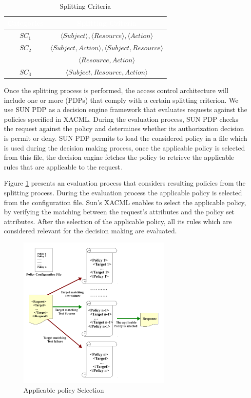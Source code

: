 \begin{table}[h!]
\centering
\setlength{\extrarowheight}{6 pt}
\begin{tabular}{|>{\small}c|>{\small}c|} 
\hline  \rowcolor{black} 
\bf
\textcolor{white}{Categories}& \bf \textcolor{white}{Splitting Criteria}\\ \hline
$SC_{1}$& {$\langle Subject \rangle, \langle Resource\rangle, \langle Action\rangle$}\\ \hline
$SC_{2}$& {$\langle Subject,Action \rangle, \langle Subject,Resource\rangle$}\\&{$\langle Resource,Action\rangle$}\\  \hline
$SC_{3}$& {$\langle Subject,Resource,Action\rangle$}\\ \hline
\end{tabular}
\caption{Splitting Criteria}
\label{table1}\end{table}



Once the splitting process is performed, the access control architecture will include one or more (PDPs) that comply with a certain splitting criterion.
We use SUN PDP \cite{sunxacml} as a decision engine framework that evaluates requests against the policies specified in XACML.
During the evaluation process, SUN PDP checks the request against the policy and determines whether its authorization
decision is 
permit or deny. SUN PDP permits to load the considered policy in a file which is used during the decision making process, once the applicable policy 
is selected from this file, the decision engine fetches the policy to retrieve the applicable rules that are applicable to the request.


Figure \ref{requestevaluation} presents an evaluation process that considers resulting policies from the splitting process. 
During the evaluation process the applicable 
policy is selected from the configuration file. Sun's XACML enables to select the applicable policy, by verifying the matching between the request's attributes
 and the policy set attributes. 
After the selection of the applicable policy, all its rules which are considered relevant for the decision making are evaluated.

\begin{figure}[!h]
\begin{center}
\includegraphics[width=3in, height=3in]{requestevaluation}
\caption{Applicable policy Selection}
\label{requestevaluation}
\end{center}
\end{figure}


